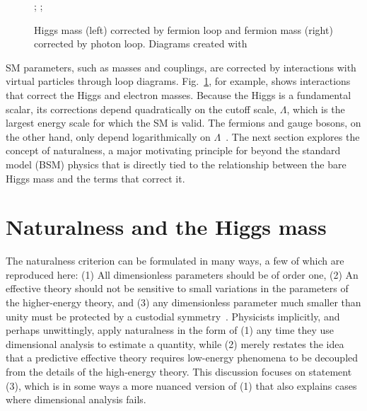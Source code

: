 \documentclass[12pt]{article}
\begin{document}
    \noindent \begin{figure}[htbp] \begin{center}
        ;
        \qquad
        ;
        \caption{Higgs mass (left) corrected by fermion loop and fermion mass (right) corrected by photon loop. Diagrams created with~\cite{tikz}}
        \label{loop_diagrams}
    \end{center} \end{figure}

    SM parameters, such as masses and couplings, are corrected by interactions with virtual particles through loop diagrams. Fig.~\ref{loop_diagrams}, for example, shows interactions that correct the Higgs and electron masses. Because the Higgs is a fundamental scalar, its corrections depend quadratically on the cutoff scale, $\Lambda$, which is the largest energy scale for which the SM is valid. The fermions and gauge bosons, on the other hand, only depend logarithmically on $\Lambda$~\cite{dine_naturalness}. The next section explores the concept of naturalness, a major motivating principle for beyond the standard model (BSM) physics that is directly tied to the relationship between the bare Higgs mass and the terms that correct it.

\section{Naturalness and the Higgs mass}
    The naturalness criterion can be formulated in many ways, a few of which are reproduced here: (1) All dimensionless parameters should be of order one, (2) An effective theory should not be sensitive to small variations in the parameters of the higher-energy theory, and (3) any dimensionless parameter much smaller than unity must be protected by a custodial symmetry~\cite{giudice_naturally, thooft_naturalness}. Physicists implicitly, and perhaps unwittingly, apply naturalness in the form of (1) any time they use dimensional analysis to estimate a quantity, while (2) merely restates the idea that a predictive effective theory requires low-energy phenomena to be decoupled from the details of the high-energy theory. This discussion focuses on statement (3), which is in some ways a more nuanced version of (1) that also explains cases where dimensional analysis fails.
\end{document}
